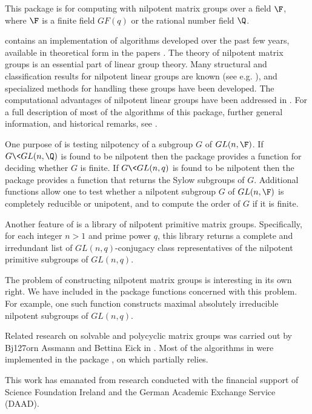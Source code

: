 

This package is for computing with nilpotent matrix groups over a
field $\F$, where $\F$ is a finite field $GF(q)$ or the rational
number field $\Q$.

 contains an implementation of algorithms
developed over the past few years, available in theoretical form
in the papers \cite{DF04,DF05b,DF06,DF07}. The theory of nilpotent
matrix groups is an essential part of linear group theory. Many
structural and classification results for nilpotent linear groups
are known (see e.g. \cite{Sup76,Weh73}), and specialized methods
for handling these groups have been developed. The computational
advantages of nilpotent linear groups have been addressed in
\cite{DF05a}. For a full description of most of the algorithms of
this package, further general information, and historical remarks,
see \cite{DF06,DF07}.

One purpose of  is testing nilpotency of a
subgroup $G$ of $GL(n,\F)$. If $G\< GL(n,\Q)$ is found to be
nilpotent then the package provides a function for deciding
whether $G$ is finite. If $G\< GL(n,q)$ is found to be nilpotent
then the package provides a function that returns the Sylow
subgroups of $G$. Additional functions allow one to test whether a
nilpotent subgroup $G$ of $GL(n,\F)$ is completely reducible or
unipotent, and to compute the order of $G$ if it is finite.

Another feature of  is a library of nilpotent
primitive matrix groups. Specifically, for each integer $n>1$ and
prime power $q$, this library returns a complete and irredundant
list of $GL(n,q)$-conjugacy class representatives of the
nilpotent primitive subgroups of $GL(n,q)$.

The problem of constructing nilpotent matrix groups is interesting
in its own right. We have included in the package functions
concerned with this problem. For example, one such function
constructs maximal absolutely irreducible nilpotent subgroups of
$GL(n,q)$.

Related research on solvable and polycyclic matrix groups was
carried out by Bj\accent127orn Assmann and Bettina Eick in
\cite{AE05,AE07}. Most of the algorithms in \cite{AE05} were
implemented in the {\GAP} package , on which
 partially relies.

This work has emanated from research conducted with the financial
support of Science Foundation Ireland and the German Academic
Exchange Service (DAAD).
